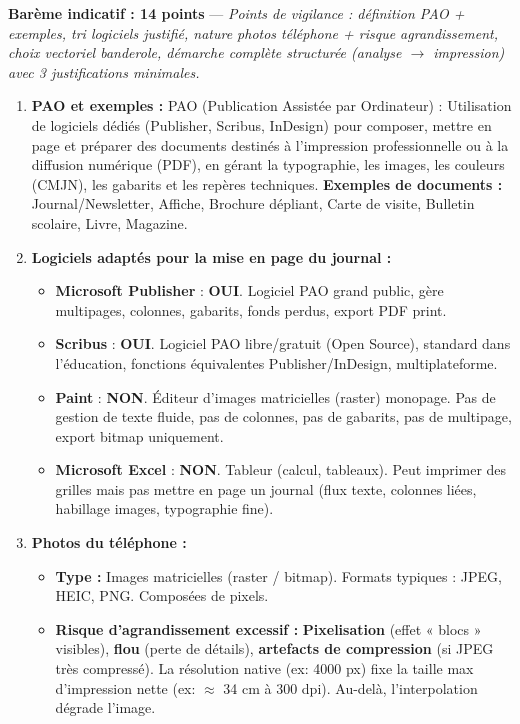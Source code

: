 \documentclass[11pt]{article}
\newcommand{\cle}[1]{{\popxbold\color{popdark}#1}}
\begin{document}
\begin{corrige}
\textbf{Barème indicatif : 14 points} — \textit{Points de vigilance : définition PAO + exemples, tri logiciels justifié, nature photos téléphone + risque agrandissement, choix vectoriel banderole, démarche complète structurée (analyse $\rightarrow$ impression) avec 3 justifications minimales.}

\begin{enumerate}
\item \textbf{PAO et exemples :}
\cle{PAO} (Publication Assistée par Ordinateur) : Utilisation de logiciels dédiés (Publisher, Scribus, InDesign) pour composer, mettre en page et préparer des documents destinés à l'impression professionnelle ou à la diffusion numérique (PDF), en gérant la typographie, les images, les couleurs (CMJN), les gabarits et les repères techniques.
\textbf{Exemples de documents :} Journal/Newsletter, Affiche, Brochure dépliant, Carte de visite, Bulletin scolaire, Livre, Magazine.

\item \textbf{Logiciels adaptés pour la mise en page du journal :}
\begin{itemize}
\item \textbf{Microsoft Publisher} : \textbf{OUI}. Logiciel PAO grand public, gère multipages, colonnes, gabarits, fonds perdus, export PDF print.
\item \textbf{Scribus} : \textbf{OUI}. Logiciel PAO libre/gratuit (Open Source), standard dans l'éducation, fonctions équivalentes Publisher/InDesign, multiplateforme.
\item \textbf{Paint} : \textbf{NON}. Éditeur d'images \cle{matricielles} (raster) monopage. Pas de gestion de texte fluide, pas de colonnes, pas de gabarits, pas de multipage, export bitmap uniquement.
\item \textbf{Microsoft Excel} : \textbf{NON}. Tableur (calcul, tableaux). Peut imprimer des grilles mais pas mettre en page un journal (flux texte, colonnes liées, habillage images, typographie fine).
\end{itemize}

\item \textbf{Photos du téléphone :}
\begin{itemize}
\item \textbf{Type :} Images \cle{matricielles} (raster / bitmap). Formats typiques : JPEG, HEIC, PNG. Composées de pixels.
\item \textbf{Risque d'agrandissement excessif :} \textbf{Pixelisation} (effet « blocs » visibles), \textbf{flou} (perte de détails), \textbf{artefacts de compression} (si JPEG très compressé). La résolution native (ex: 4000 px) fixe la taille max d'impression nette (ex: $\approx$ 34 cm à 300 dpi). Au-delà, l'interpolation dégrade l'image.
\end{itemize}


\end{enumerate}
\end{corrige}
\end{document}
